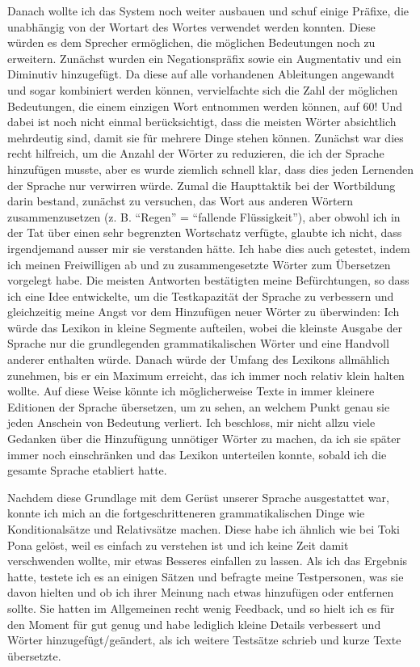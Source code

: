 \documentclass{article}
\begin{document}
Danach wollte ich das System noch weiter ausbauen und schuf einige Präfixe, die unabhängig von der Wortart des Wortes
verwendet werden konnten. Diese würden es dem Sprecher ermöglichen, die möglichen Bedeutungen noch zu erweitern.
Zunächst wurden ein Negationspräfix sowie ein Augmentativ und ein Diminutiv hinzugefügt. Da diese auf alle vorhandenen
Ableitungen angewandt und sogar kombiniert werden können, vervielfachte sich die Zahl der möglichen Bedeutungen,
die einem einzigen Wort entnommen werden können, auf 60! Und dabei ist noch nicht einmal berücksichtigt,
dass die meisten Wörter absichtlich mehrdeutig sind, damit sie für mehrere Dinge stehen können. Zunächst war dies recht hilfreich,
um die Anzahl der Wörter zu reduzieren, die ich der Sprache hinzufügen musste, aber es wurde ziemlich schnell klar,
dass dies jeden Lernenden der Sprache nur verwirren würde. Zumal die Haupttaktik bei der Wortbildung darin bestand,
zunächst zu versuchen, das Wort aus anderen Wörtern zusammenzusetzen (z. B. ``Regen'' = ``fallende Flüssigkeit''),
aber obwohl ich in der Tat über einen sehr begrenzten Wortschatz verfügte, glaubte ich nicht, dass irgendjemand ausser mir sie
verstanden hätte. Ich habe dies auch getestet, indem ich meinen Freiwilligen ab und zu zusammengesetzte
Wörter zum Übersetzen vorgelegt habe. Die meisten Antworten bestätigten meine Befürchtungen, so dass ich eine Idee entwickelte,
um die Testkapazität der Sprache zu verbessern und gleichzeitig meine Angst vor dem Hinzufügen neuer Wörter zu überwinden:
Ich würde das Lexikon in kleine Segmente aufteilen, wobei die kleinste Ausgabe der Sprache nur die grundlegenden
grammatikalischen Wörter und eine Handvoll anderer enthalten würde. Danach würde der Umfang des Lexikons allmählich zunehmen,
bis er ein Maximum erreicht, das ich immer noch relativ klein halten wollte. Auf diese Weise könnte ich möglicherweise
Texte in immer kleinere Editionen der Sprache übersetzen, um zu sehen, an welchem Punkt genau sie jeden Anschein von
Bedeutung verliert. Ich beschloss, mir nicht allzu viele Gedanken über die Hinzufügung unnötiger Wörter zu machen,
da ich sie später immer noch einschränken und das Lexikon unterteilen konnte, sobald ich die gesamte Sprache etabliert hatte.

Nachdem diese Grundlage mit dem Gerüst unserer Sprache ausgestattet war, konnte ich mich an die fortgeschritteneren
grammatikalischen Dinge wie Konditionalsätze und Relativsätze machen. Diese habe ich ähnlich wie bei Toki Pona gelöst,
weil es einfach zu verstehen ist und ich keine Zeit damit verschwenden wollte, mir etwas Besseres einfallen zu lassen.
Als ich das Ergebnis hatte, testete ich es an einigen Sätzen und befragte meine Testpersonen, was sie davon hielten und
ob ich ihrer Meinung nach etwas hinzufügen oder entfernen sollte. Sie hatten im Allgemeinen recht wenig Feedback,
und so hielt ich es für den Moment für gut genug und habe lediglich kleine Details verbessert und Wörter hinzugefügt/geändert,
als ich weitere Testsätze schrieb und kurze Texte übersetzte.
\end{document}
